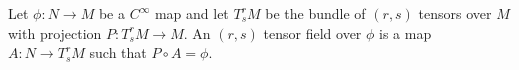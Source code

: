 Let $\phi: N \rightarrow M$ be a $C^\infty$ map and let $T_s^r M$ be the bundle of $(r, s)$ tensors over $M$ with projection $P: T_s^r M \rightarrow M$. An $(r, s)$ tensor field over $\phi$ is a map $A: N \rightarrow T_s^r M$ such that $P \circ A = \phi$.
